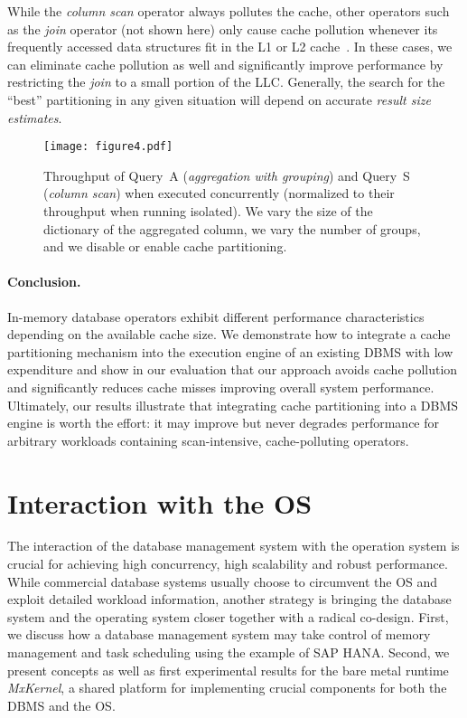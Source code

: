 \documentclass[11pt]{article}
\begin{document}
While the \emph{column scan} operator always pollutes the cache, other operators such as the \emph{join} operator (not shown here) only cause cache pollution whenever its frequently accessed data structures fit in the L1 or L2 cache~\cite{nollhrm19:Noll:2018}.
In these cases, we can eliminate cache pollution as well and significantly improve performance by restricting the \emph{join} to a small portion of the LLC.
Generally, the search for the ``best'' partitioning in any given situation will depend on accurate \emph{result size estimates}.

\begin{figure}
\centering
\texttt{[image: figure4.pdf]}
\caption{%
Throughput of Query~A (\emph{aggregation with grouping}) and Query~S (\emph{column scan}) when executed concurrently (normalized to their throughput when running isolated).
We vary the size of the dictionary of the aggregated column, we vary the number of groups, and we
disable or enable cache partitioning.
}
\label{nollhrm19:plt:scan_aggregate}
\end{figure}

\paragraph{Conclusion.}
In-memory database operators exhibit different performance characteristics depending on the available cache size.
We demonstrate how to integrate a cache partitioning mechanism into the execution engine of an existing DBMS with low expenditure and show in our evaluation that our approach avoids cache pollution and significantly reduces cache misses improving overall system performance.
Ultimately, our results illustrate that integrating cache partitioning into a DBMS engine is worth the effort: it may improve but never degrades performance for arbitrary workloads containing scan-intensive, cache-polluting operators.



\section{Interaction with the OS}
\label{nollhrm19:sec:dbms_os}

The interaction of the database management system with the operation system is crucial for achieving high concurrency, high scalability and robust performance.
While commercial database systems usually choose to circumvent the OS and exploit detailed workload information, another strategy is bringing the database system and the operating system closer together with a radical co-design.
First, we discuss how a database management system may take control of memory management and task scheduling using the example of SAP HANA\@.
Second, we present concepts as well as first experimental results for the bare metal runtime \emph{MxKernel}, a shared platform for implementing crucial components for both the DBMS and the OS. 
\end{document}
